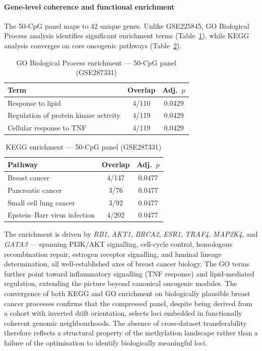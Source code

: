 \paragraph{Gene-level coherence and functional enrichment}

The 50-CpG panel maps to 42 unique genes. Unlike
GSE225845, GO Biological Process analysis identifies
significant enrichment terms
(Table~\ref{tab:gse287331_go}), while KEGG analysis
converges on core oncogenic pathways
(Table~\ref{tab:gse287331_kegg}).

\begin{table}[H]
\centering
\caption{GO Biological Process enrichment — 50-CpG panel
         (GSE287331)}
\label{tab:gse287331_go}
\begin{tabular}{lcc}
\toprule
Term & Overlap & Adj.\ $p$ \\
\midrule
Response to lipid                      & 4/110 & 0.0429 \\
Regulation of protein kinase activity  & 4/119 & 0.0429 \\
Cellular response to TNF               & 4/119 & 0.0429 \\
\bottomrule
\end{tabular}
\end{table}

\begin{table}[H]
\centering
\caption{KEGG enrichment — 50-CpG panel (GSE287331)}
\label{tab:gse287331_kegg}
\begin{tabular}{lcc}
\toprule
Pathway & Overlap & Adj.\ $p$ \\
\midrule
Breast cancer              & 4/147 & 0.0477 \\
Pancreatic cancer          & 3/76  & 0.0477 \\
Small cell lung cancer     & 3/92  & 0.0477 \\
Epstein--Barr virus infection & 4/202 & 0.0477 \\
\bottomrule
\end{tabular}
\end{table}

The enrichment is driven by \textit{RB1}, \textit{AKT1},
\textit{BRCA2}, \textit{ESR1}, \textit{TRAF4},
\textit{MAP2K4}, and \textit{GATA3} — spanning PI3K/AKT
signalling, cell-cycle control, homologous recombination
repair, estrogen receptor signalling, and luminal lineage
determination, all well-established axes of breast cancer
biology. The GO terms further point toward inflammatory
signalling (TNF response) and lipid-mediated regulation,
extending the picture beyond canonical oncogenic modules.
The convergence of both KEGG and GO enrichment on
biologically plausible breast cancer processes confirms
that the compressed panel, despite being derived from a
cohort with inverted drift orientation, selects loci
embedded in functionally coherent genomic neighbourhoods.
The absence of cross-dataset transferability therefore
reflects a structural property of the methylation
landscape rather than a failure of the optimisation
to identify biologically meaningful loci.



